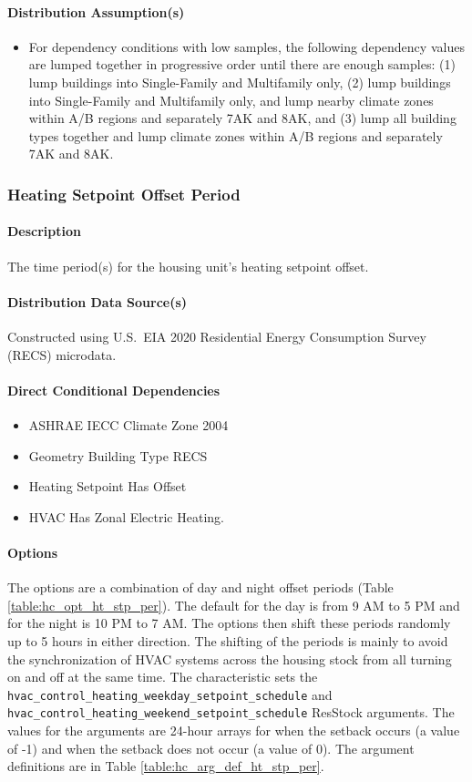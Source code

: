 \paragraph{Distribution Assumption(s)}
\begin{itemize}
    \item For dependency conditions with low samples, the following dependency values are lumped together in progressive order until there are enough samples: (1) lump buildings into Single-Family and Multifamily only, (2) lump buildings into Single-Family and Multifamily only, and lump nearby climate zones within A/B regions and separately 7AK and 8AK, and (3) lump all building types together and lump climate zones within A/B regions and separately 7AK and 8AK.
\end{itemize}

\subsubsection{Heating Setpoint Offset Period}
\paragraph{Description}
The time period(s) for the housing unit's heating setpoint offset. 

\paragraph{Distribution Data Source(s)}
Constructed using U.S.~EIA 2020 Residential Energy Consumption Survey (RECS) microdata.

\paragraph{Direct Conditional Dependencies}
\begin{itemize}
    \item ASHRAE IECC Climate Zone 2004
    \item Geometry Building Type RECS
    \item Heating Setpoint Has Offset
    \item HVAC Has Zonal Electric Heating.
\end{itemize}

\paragraph{Options}
The options are a combination of day and night offset periods (Table \ref{table:hc_opt_ht_stp_per}). The default for the day is from 9 AM to 5 PM and for the night is 10 PM to 7 AM. The options then shift these periods randomly up to 5 hours in either direction. The shifting of the periods is mainly to avoid the synchronization of HVAC systems across the housing stock from all turning on and off at the same time. The characteristic sets the \texttt{hvac\_control\_heating\_weekday\_setpoint\_schedule} and \texttt{hvac\_control\_heating\_weekend\_setpoint\_schedule} ResStock arguments. The values for the arguments are 24-hour arrays for when the setback occurs (a value of -1) and when the setback does not occur (a value of 0). The argument definitions are in Table \ref{table:hc_arg_def_ht_stp_per}.


